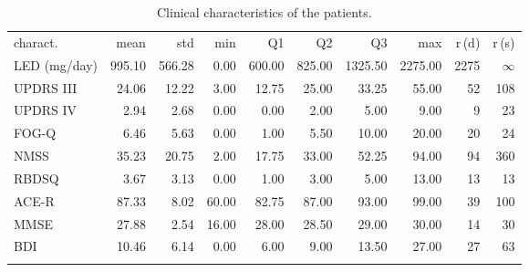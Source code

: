 \begin{table}[htb!]
	\centering
	\begin{threeparttable}
		\caption{Clinical characteristics of the patients.}
		\label{tab:ch5_clinical_data}
		\footnotesize
		\centering
		\begin{tabular}{l r r r r r r r r r}

			\hline\hline\noalign{\smallskip}
			\rowcolor{gray_table}
			charact. & mean & std & min & Q1 & Q2 & Q3 & max & r\,(d) & r\,(s) \\
			\noalign{\smallskip}\hline\noalign{\smallskip}
			
			LED (mg/day) &  995.10 &  566.28 &    0.00 &  600.00 &  825.00 & 1325.50 & 2275.00 & 2275 &  $\infty$ \\
			UPDRS III    &   24.06 &   12.22 &    3.00 &   12.75 &   25.00 &   33.25 &   55.00 &   52 &  108 \\
			UPDRS IV     &    2.94 &    2.68 &    0.00 &    0.00 &    2.00 &    5.00 &    9.00 &    9 &   23 \\
			FOG-Q        &    6.46 &    5.63 &    0.00 &    1.00 &    5.50 &   10.00 &   20.00 &   20 &   24 \\
			NMSS         &   35.23 &   20.75 &    2.00 &   17.75 &   33.00 &   52.25 &   94.00 &   94 &  360 \\
			RBDSQ        &    3.67 &    3.13 &    0.00 &    1.00 &    3.00 &    5.00 &   13.00 &   13 &   13 \\
			ACE-R        &   87.33 &    8.02 &   60.00 &   82.75 &   87.00 &   93.00 &   99.00 &   39 &  100 \\
			MMSE         &   27.88 &    2.54 &   16.00 &   28.00 &   28.50 &   29.00 &   30.00 &   14 &   30 \\
			BDI          &   10.46 &    6.14 &    0.00 &    6.00 &    9.00 &   13.50 &   27.00 &   27 &   63 \\ 
			
			\noalign{\smallskip}\hline\hline
		\end{tabular}


\end{threeparttable}
\end{table}
